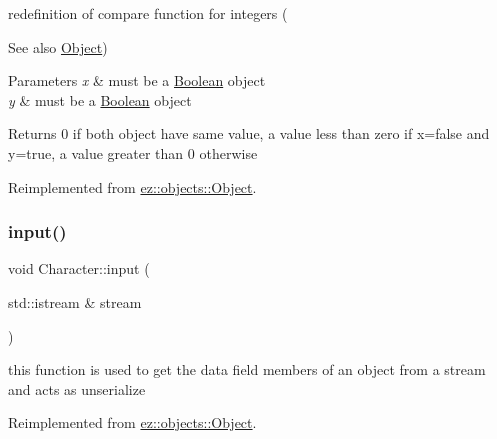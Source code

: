 redefinition of compare function for integers (\begin{DoxySeeAlso}{See also}
\hyperlink{classez_1_1objects_1_1Object}{Object}) 
\end{DoxySeeAlso}

\begin{DoxyParams}{Parameters}
{\em x} & must be a \hyperlink{classez_1_1objects_1_1Boolean}{Boolean} object \\
\hline
{\em y} & must be a \hyperlink{classez_1_1objects_1_1Boolean}{Boolean} object \\
\hline
\end{DoxyParams}
\begin{DoxyReturn}{Returns}
0 if both object have same value, a value less than zero if x=false and y=true, a value greater than 0 otherwise 
\end{DoxyReturn}


Reimplemented from \hyperlink{classez_1_1objects_1_1Object_aca311d389dffa204e425463145f4e1e6}{ez\+::objects\+::\+Object}.

\mbox{\label{classez_1_1objects_1_1Character_a021f11fd444493316c4d55e6efb031f5}} 
\subsubsection{\texorpdfstring{input()}{input()}}
{\footnotesize\ttfamily void Character\+::input (\begin{DoxyParamCaption}\item[{std\+::istream \&}]{stream }\end{DoxyParamCaption})\hspace{0.3cm}{\ttfamily [virtual]}}

this function is used to get the data field members of an object from a stream and acts as unserialize 

Reimplemented from \hyperlink{classez_1_1objects_1_1Object_a878bdc53b7f16fda6fa15dab214c4b6a}{ez\+::objects\+::\+Object}.

\mbox{\label{classez_1_1objects_1_1Character_ae94793b98d9c5a173ba73e110420f187}} 
